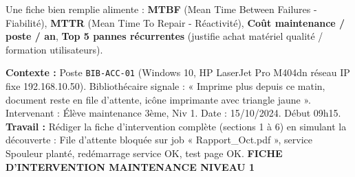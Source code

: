 \documentclass[11pt]{article}
\begin{document}
\begin{aretenir}
    Une fiche bien remplie alimente : \textbf{MTBF} (Mean Time Between Failures - Fiabilité), \textbf{MTTR} (Mean Time To Repair - Réactivité), \textbf{Coût maintenance / poste / an}, \textbf{Top 5 pannes récurrentes} (justifie achat matériel qualité / formation utilisateurs).
\end{aretenir}

\begin{exoresolu}
\textbf{Contexte :} Poste \texttt{BIB-ACC-01} (Windows 10, HP LaserJet Pro M404dn réseau IP fixe 192.168.10.50). Bibliothécaire signale : « Imprime plus depuis ce matin, document reste en file d'attente, icône imprimante avec triangle jaune ». Intervenant : Élève maintenance 3ème, Niv 1. Date : 15/10/2024. Début 09h15.
\textbf{Travail :} Rédiger la fiche d'intervention complète (sections 1 à 6) en simulant la découverte : File d'attente bloquée sur job « Rapport\_Oct.pdf », service Spouleur planté, redémarrage service OK, test page OK.
\tcblower
\textbf{FICHE D'INTERVENTION MAINTENANCE NIVEAU 1}


\end{exoresolu}
\end{document}
